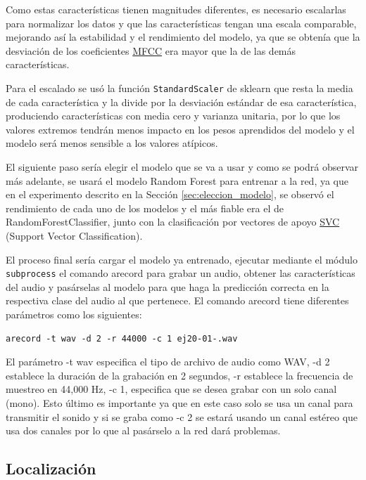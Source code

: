 Como estas características tienen magnitudes diferentes, es necesario escalarlas para normalizar los datos y que las características tengan una escala comparable, mejorando así la estabilidad y el rendimiento del modelo, ya que se obtenía que la desviación de los coeficientes \hyperlink{MFCC}{MFCC} era mayor que la de las demás características. 

Para el escalado se usó la función \verb|StandardScaler| de sklearn que resta la media de cada característica y la divide por la desviación estándar de esa característica, produciendo características con media cero y varianza unitaria, por lo que los valores extremos tendrán menos impacto en los pesos aprendidos del modelo y el modelo será menos sensible a los valores atípicos. 

El siguiente paso sería elegir el modelo que se va a usar y como se podrá observar más adelante, se usará el modelo Random Forest para entrenar a la red, ya que en el experimento descrito en la Sección \ref{sec:eleccion_modelo}, se observó el rendimiento de cada uno de los modelos y el más fiable era el de RandomForestClassifier, junto con la clasificación por vectores de apoyo \hyperlink{SVC}{SVC} (Support Vector Classification).

El proceso final sería cargar el modelo ya entrenado, ejecutar mediante el módulo \texttt{subprocess} el comando arecord para grabar un audio, obtener las características del audio y pasárselas al modelo para que haga la predicción correcta en la respectiva clase del audio al que pertenece. El comando arecord tiene diferentes parámetros como los siguientes: 

\begin{verbatim}
arecord -t wav -d 2 -r 44000 -c 1 ej20-01-.wav 
\end{verbatim}

El parámetro -t wav especifica el tipo de archivo de audio como WAV, -d 2 establece la duración de la grabación en 2 segundos, -r establece la frecuencia de muestreo en 44,000 Hz, -c 1, especifica que se desea grabar con un solo canal (mono). Esto último es importante ya que en este caso solo se usa un canal para transmitir el sonido y si se graba como -c 2 se estará usando un canal estéreo que usa dos canales por lo que al pasárselo a la red dará problemas.


\subsection{Localización}
\label{subsec:localización}

